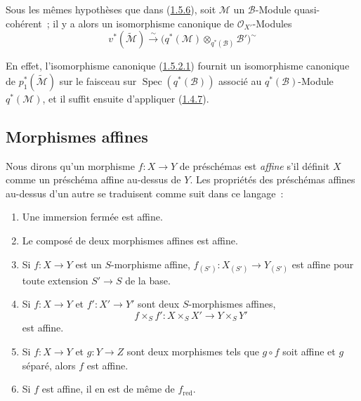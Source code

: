 \begin{env}[1.5.7]
\label{II.1.5.7-fr}
Sous les mêmes hypothèses que dans (\hyperref[II.1.5.6-fr]{1.5.6}), soit
$\mathcal{M}$ un $\mathcal{B}$-Module quasi-cohérent~; il y a alors un
isomorphisme canonique de $\mathcal{O}_{X'}$-Modules
\[
  v^*(\widetilde{\mathcal{M}})\xrightarrow{\sim}
  \bigl(q^*(\mathcal{M})\otimes_{q^*(\mathcal{B})}\mathcal{B}'\bigr)^{\sim}
  \tag{1.5.7.1}\label{II.1.5.7.1-fr}
\]

En effet, l'isomorphisme canonique
(\hyperref[II.1.5.2.1-fr]{1.5.2.1}) fournit un isomorphisme canonique de
$p_1^*(\widetilde{\mathcal{M}})$ sur le faisceau sur
$\operatorname{Spec}(q^*(\mathcal{B}))$ associé au
$q^*(\mathcal{B})$-Module $q^*(\mathcal{M})$, et il suffit ensuite d'appliquer
(\hyperref[II.1.4.7-fr]{1.4.7}).
\end{env}

\subsection{Morphismes affines}
\label{II.1.6-fr}

\begin{env}[1.6.1]
\label{II.1.6.1-fr}
Nous dirons qu'un morphisme $f:X\to Y$ de préschémas est \emph{affine} s'il
définit $X$ comme un préschéma affine au-dessus de $Y$. Les propriétés des
préschémas affines au-dessus d'un autre se traduisent comme suit dans ce
langage~:
\end{env}

\begin{proposition}[1.6.2]
\label{II.1.6.2-fr}
\begin{enumerate}
  \item[\rm(i)] Une immersion fermée est affine.
  \item[\rm(ii)] Le composé de deux morphismes affines est affine.
  \item[\rm(iii)] Si $f:X\to Y$ est un $S$-morphisme affine,
    $f_{(S')}:X_{(S')}\to Y_{(S')}$ est affine pour toute extension $S'\to S$
    de la base.
  \item[\rm(iv)] Si $f:X\to Y$ et $f':X'\to Y'$ sont deux $S$-morphismes
    affines,
    \[
      f\times_S f':X\times_S X'\to Y\times_S Y'
    \]
    est affine.
  \item[\rm(v)] Si $f:X\to Y$ et $g:Y\to Z$ sont deux morphismes tels que
    $g\circ f$ soit affine et $g$ séparé, alors $f$ est affine.
  \item[\rm(vi)] Si $f$ est affine, il en est de même de
    $f_{\mathrm{red}}$.
\end{enumerate}
\end{proposition}

